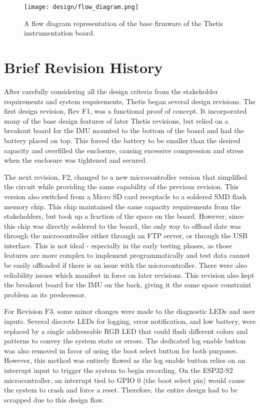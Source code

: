 \begin{figure}[h!]
	\centering
	\texttt{[image: design/flow\_diagram.png]}
	\caption[Base Firmware Flow Diagram]{A flow diagram representation of the base firmware of the Thetis instrumentation board.}
\end{figure}

\section{Brief Revision History} 

After carefully considering all the design criteria from the stakeholder requirements and system requirements, Thetis began several design revisions.
The first design revision, Rev F1, was a functional proof of concept.
It incorporated many of the base design features of later Thetis revisions, but relied on a breakout board for the IMU mounted to the bottom of the board and had the battery placed on top.
This forced the battery to be smaller than the desired capacity and overfilled the enclosure, causing excessive compression and stress when the enclosure was tightened and secured.


The next revision, F2, changed to a new microcontroller version that simplified the circuit while providing the same capability of the previous revision.
This version also switched from a Micro SD card receptacle to a soldered SMD flash memory chip.
This chip maintained the same capacity requirements from the stakeholders, but took up a fraction of the space on the board.
However, since this chip was directly soldered to the board, the only way to offload date was through the microcontroller either through an FTP server, or through the USB interface.
This is not ideal - especially in the early testing phases, as those features are more complex to implement programmatically and test data cannot be easily offloaded if there is an issue with the microcontroller.
There were also reliability issues which manifest in force on later revisions.
This revision also kept the breakout board for the IMU on the back, giving it the same space constraint problem as its predecessor.


For Revision F3, some minor changes were made to the diagnostic LEDs and user inputs.
Several discrete LEDs for logging, error notification, and low battery, were replaced by a single addressable RGB LED that could flash different colors and patterns to convey the system state or errors.
The dedicated log enable button was also removed in favor of using the boot select button for both purposes.
However, this method was entirely flawed as the log enable button relies on an interrupt input to trigger the system to begin recording.
On the ESP32-S2 microcontroller, an interrupt tied to GPIO 0 (the boot select pin) would cause the system to crash and force a reset.
Therefore, the entire design had to be scrapped due to this design flaw.

